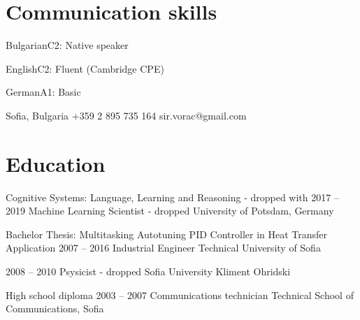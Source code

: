 \documentclass{tccv}
\begin{document}
\section{Communication skills}
\begin{factlist}
\item{Bulgarian}{C2: Native speaker}
\item{English}{C2: Fluent (Cambridge CPE)}
\item{German}{A1: Basic}
\end{factlist}


\personal
    {Sofia, Bulgaria}
    {+359 2 895 735 164}
    {sir.vorac@gmail.com}


\section{Education}
\begin{yearlist}
\item[{\footnotesize Cognitive Systems: Language, Learning and Reasoning - dropped with }]
     {2017 -- 2019}
     {Machine Learning Scientist - dropped}
     {University of Potsdam, Germany}

\item[Bachelor Thesis:                 \newline
     {\footnotesize Multitasking Autotuning PID Controller in Heat Transfer Application}]
     {2007 -- 2016}
     {Industrial Engineer}
     {Technical University of Sofia}

\item[]
     {2008 -- 2010}
     {Psysicist - dropped}
     {Sofia University Kliment Ohridski}

\item[High school diploma]{2003 -- 2007}
     {Communications technician}
     {Technical School of Communications, Sofia}
\end{yearlist}


\newpage
\end{document}
